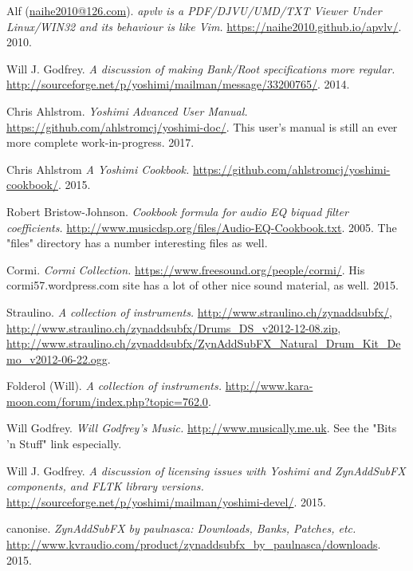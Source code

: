 \begin{thebibliography}{99}

   Alf (\href{mailto:naihe2010@126.com}{naihe2010@126.com}).
   \emph{apvlv is a PDF/DJVU/UMD/TXT Viewer Under Linux/WIN32 and its behaviour
   is like Vim.}
   \url{https://naihe2010.github.io/apvlv/}.
   2010.

   Will J. Godfrey.
   \emph{A discussion of making Bank/Root specifications more regular.}
   \url{http://sourceforge.net/p/yoshimi/mailman/message/33200765/}.
   2014.

   Chris Ahlstrom.
   \emph{Yoshimi Advanced User Manual.}
   \url{https://github.com/ahlstromcj/yoshimi-doc/}.
   This user's manual is still an ever more complete work-in-progress.
   2017.

   Chris Ahlstrom
   \emph{A Yoshimi Cookbook.}
   \url{https://github.com/ahlstromcj/yoshimi-cookbook/}.
   2015.

   Robert Bristow-Johnson.
   \emph{Cookbook formula for audio EQ biquad filter coefficients.}
   \url{http://www.musicdsp.org/files/Audio-EQ-Cookbook.txt}.
   2005.  The "files" directory has a number interesting files as well.

   Cormi.
   \emph{Cormi Collection.}
   \url{https://www.freesound.org/people/cormi/}.
   His cormi57.wordpress.com site has a lot of other nice sound material, as well.
   2015.

   Straulino.
   \emph{A collection of instruments.}
   \url{http://www.straulino.ch/zynaddsubfx/},
   \url{http://www.straulino.ch/zynaddsubfx/Drums\_DS\_v2012-12-08.zip},
   \url{http://www.straulino.ch/zynaddsubfx/ZynAddSubFX\_Natural\_Drum\_Kit\_Demo\_v2012-06-22.ogg}.

   Folderol (Will).
   \emph{A collection of instruments.}
   \url{http://www.kara-moon.com/forum/index.php?topic=762.0}.

   Will Godfrey.
   \emph{Will Godfrey's Music.}
   \url{http://www.musically.me.uk}.
   See the "Bits 'n Stuff" link especially.

   Will J. Godfrey.
   \emph{A discussion of licensing issues with Yoshimi and ZynAddSubFX
   components, and FLTK library versions.}
   \url{http://sourceforge.net/p/yoshimi/mailman/yoshimi-devel/}.
   2015.

   canonise.
   \emph{ZynAddSubFX by paulnasca: Downloads, Banks, Patches, etc.}
   \url{http://www.kvraudio.com/product/zynaddsubfx\_by\_paulnasca/downloads}.
   2015.


\end{thebibliography}
